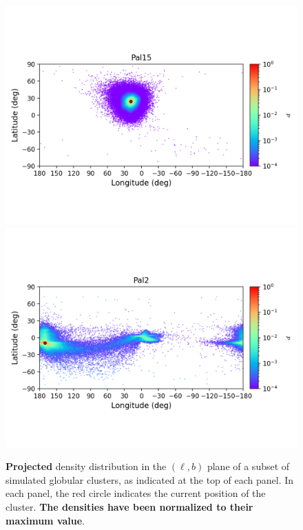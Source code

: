 \begin{figure}
        \includegraphics[clip=true, trim = 0mm 20mm 0mm 10mm, width=1\columnwidth]{images/error_plots_Pal15.png}
        \includegraphics[clip=true, trim = 0mm 20mm 0mm 10mm, width=1\columnwidth]{images/error_plots_Pal2.png}
        \caption[]{\textbf{Projected} density distribution in the $(\ell, b)$ plane of a subset of simulated globular clusters, as indicated at the top of each panel. In each panel, the red circle indicates the current position of the cluster. \textbf{The densities have been normalized to their maximum value}.}\label{stream17}
        \end{figure}
